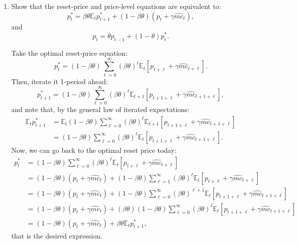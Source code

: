 \documentclass[dvipsnames,11pt]{article}
\begin{document}
\begin{enumerate}
\begin{solution}
    
                
            \end{solution}
    
        \item Show that the reset-price and price-level equations are equivalent to:
        \[
        p^*_t = \beta \theta \mathbb{E}_t p^*_{t+1} + (1 - \beta \theta)(p_t +  \gamma \widehat{mc}_{t}),
        \]
        and
        \[
        p_t = \theta p_{t-1} + (1 - \theta) p^*_t.
        \]
    
            \begin{solution}
 Take the optimal reset-price equation:   
\[
    p^*_t = (1 - \beta \theta) \sum_{\ell=0}^\infty (\beta \theta)^\ell \mathbb{E}_t [p_{t+\ell} + \gamma \widehat{mc}_{t + \ell }].
    \]
Then, iterate it 1-period ahead:
\[
    p^*_{t+1} = (1 - \beta \theta) \sum_{\ell=0}^\infty (\beta \theta)^\ell \mathbb{E}_{t+1} [p_{t+1+\ell} + \gamma \widehat{mc}_{t+1 + \ell }],
    \]
and note that, by the general law of iterated expectations:
\begin{align*}
\mathbb{E}_t p^*_{t+1} &= \mathbb{E}_t (1 - \beta \theta) \sum_{\ell=0}^\infty (\beta \theta)^\ell \mathbb{E}_{t+1} [p_{t+1+\ell} + \gamma \widehat{mc}_{t+1 + \ell }] \\
&= (1 - \beta \theta) \sum_{\ell=0}^\infty (\beta \theta)^\ell \mathbb{E}_{t} [p_{t+1+\ell} + \gamma \widehat{mc}_{t+1 + \ell }].
\end{align*}
Now, we can go back to the optimal reset price today:
\begin{align*}
    p^*_t &= (1 - \beta \theta) \sum_{\ell=0}^\infty (\beta \theta)^\ell \mathbb{E}_t [p_{t+\ell} + \gamma \widehat{mc}_{t + \ell }] \\
    &= (1-\beta \theta) (p_t+\gamma \widehat{mc}_t)+(1-\beta \theta) \sum_{\ell=1}^\infty (\beta \theta)^\ell \mathbb{E}_t[p_{t+\ell}+\gamma \widehat{mc}_{t+\ell}] \\
    &= (1-\beta \theta)(p_t+\gamma \widehat{mc}_t)+(1-\beta\theta)\sum_{\ell=0}^\infty (\beta\theta)^{\ell+1}\mathbb{E}_t[p_{t+1+\ell}+\gamma \widehat{mc}_{t+1+\ell}] \\
    &=(1-\beta \theta)(p_t+\gamma \widehat{mc}_t)+(\beta \theta) (1-\beta\theta)\sum_{\ell=0}^\infty (\beta\theta)^{\ell}\mathbb{E}_t[p_{t+1+\ell}+\gamma \widehat{mc}_{t+1+\ell}] \\
    &= (1-\beta \theta)(p_t+\gamma \widehat{mc}_t) + \beta \theta \mathbb{E}_t p_{t+1}^*,
\end{align*}
that is the desired expression.


\end{solution}
\end{enumerate}
\end{document}
